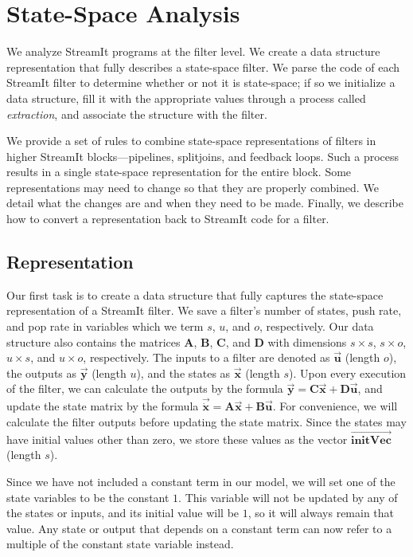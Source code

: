 \chapter{State-Space Analysis}

  We analyze StreamIt programs at the filter level. We create
a data structure representation that fully describes a state-space
filter. We parse the code of each StreamIt filter to determine
whether or not it is state-space; if so we initialize a data
structure, fill it with the appropriate values through a process
called \emph{extraction}, and associate the structure with the
filter.

    We provide a set of rules to combine state-space representations
of filters in higher StreamIt blocks---pipelines, splitjoins, and
feedback loops. Such a process results in a single state-space
representation for the entire block. Some representations may need
to change so that they are properly combined. We detail what the
changes are and when they need to be made. Finally, we describe
how to convert a representation back to StreamIt code for a
filter.

\section{Representation}

    Our first task is to create a data structure that fully captures
the state-space representation of a StreamIt filter.  We save a
filter's number of states, push rate, and pop rate in variables
which we term $s$, $u$, and $o$, respectively. Our data structure
also contains the matrices $\mathbf{A}$, $\mathbf{B}$,
$\mathbf{C}$, and $\mathbf{D}$ with dimensions $s \times s$, $s
\times o$, $u \times s$, and $u \times o$, respectively. The
inputs to a filter are denoted as $\vec{\mathbf{u}}$ (length $o$),
the outputs as $\vec{\mathbf{y}}$ (length $u$), and the states as
$\vec{\mathbf{x}}$ (length $s$). Upon every execution of the
filter, we can calculate the outputs by the formula
$\vec{\mathbf{y}} = \mathbf{C}\vec{\mathbf{x}} +
\mathbf{D}\vec{\mathbf{u}}$, and update the state matrix by the
formula $\vec{\dot{\mathbf{x}}} = \mathbf{A}\vec{\mathbf{x}} +
\mathbf{B}\vec{\mathbf{u}}$. For convenience, we will calculate
the filter outputs before updating the state matrix. Since the
states may have initial values other than zero, we store these
values as the vector $\overrightarrow{\mathbf{initVec}}$ (length
$s$).

    Since we have not included a constant term in our model, we
will set one of the state variables to be the constant $1$. This
variable will not be updated by any of the states or inputs, and
its initial value will be $1$, so it will always remain that
value. Any state or output that depends on a constant term can now
refer to a multiple of the constant state variable instead.

